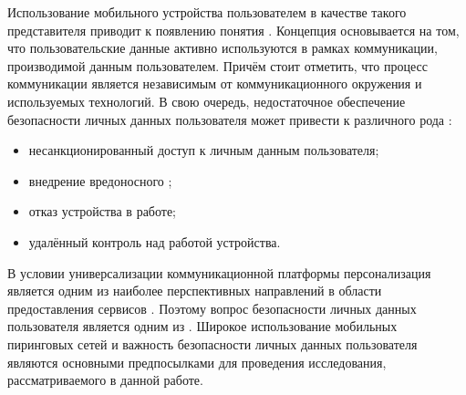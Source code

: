%
Использование мобильного устройства пользователем в качестве такого представителя приводит к появлению понятия  .
%
Концепция  основывается на том, что пользовательские данные активно используются в рамках коммуникации, производимой данным пользователем.
%
Причём стоит отметить, что процесс коммуникации является независимым от коммуникационного окружения и используемых технологий.
%
В свою очередь, недостаточное обеспечение безопасности личных данных пользователя может привести к различного рода  :
\begin{itemize}
	\item несанкционированный доступ к личным данным пользователя;
	\item внедрение вредоносного ;
	\item отказ устройства в работе;
	\item удалённый контроль над работой устройства.
\end{itemize}

%
В условии универсализации коммуникационной платформы персонализация является одним из наиболее перспективных направлений в области предоставления сервисов .
%
Поэтому вопрос безопасности личных данных пользователя является одним из .
%
Широкое использование мобильных пиринговых сетей и важность безопасности личных данных пользователя являются основными предпосылками для проведения исследования, рассматриваемого в данной работе.